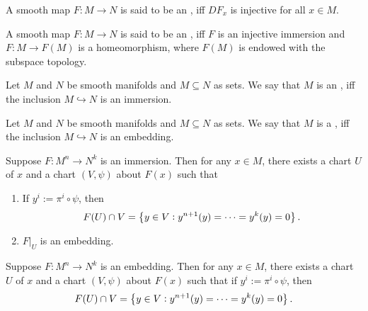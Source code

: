 \begin{definition}[Immersion]
	A smooth map $F : M \to N$ is said to be an , iff $DF_x$ is injective for all $x \in M$.
\end{definition}

\begin{definition}[Embedding]
	A smooth map $F : M \to N$ is said to be an , iff $F$ is an injective immersion and $F : M \to F(M)$ is a homeomorphism, where $F(M)$ is endowed with the subspace topology. 	
\end{definition}

\begin{definition}
	Let $M$ and $N$ be smooth manifolds and $M \subseteq N$ as sets. We say that $M$ is an , iff the inclusion $M \hookrightarrow N$ is an immersion. 
\end{definition}

\begin{definition}
	Let $M$ and $N$ be smooth manifolds and $M \subseteq N$ as sets. We say that $M$ is a , iff the inclusion $M \hookrightarrow N$ is an embedding. 
\end{definition}

\begin{proposition}
	Suppose $F : M^n \to N^k$ is an immersion. Then for any $x \in M$, there exists a chart $U$ of $x$ and a chart $(V,\psi)$ about $F(x)$ such that
	\begin{enumerate}[label=\textup{(\alph*)},leftmargin=*]
		\item If $y^i := \pi^i \circ \psi$, then
			\begin{equation*}
				F(U) \cap V = \cbr[1]{y \in V : y^{n + 1}(y) = \dots = y^k(y)= 0}. 
			\end{equation*}
		\item $F\vert_U$ is an embedding.
	\end{enumerate}
\end{proposition}

\begin{proposition}
	Suppose $F : M^n \to N^k$ is an embedding. Then for any $x \in M$, there exists a chart $U$ of $x$ and a chart $(V,\psi)$ about $F(x)$ such that if $y^i := \pi^i \circ \psi$, then
	\begin{equation*}
		F(U) \cap V = \cbr[1]{y \in V : y^{n + 1}(y) = \dots = y^k(y)= 0}. 
	\end{equation*}
\end{proposition}

